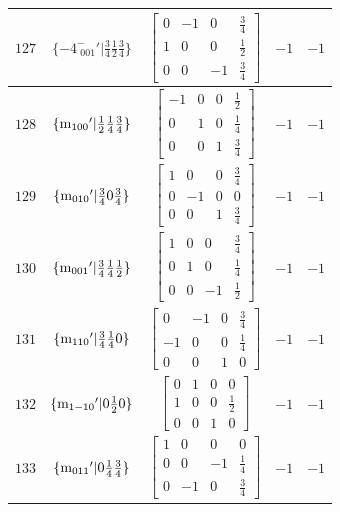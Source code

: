 \documentclass[fleqn,8pt]{jsarticle}
\begin{document}
\begin{longtable}{ccccc}
$ 127 $ & $ \{-4^{-}_{\,\,001}{}'|\frac{3}{4} \frac{1}{2} \frac{3}{4}\} $ & $ \begin{bmatrix} 0 & -1 & 0 & \frac{3}{4} \\ 1 & 0 & 0 & \frac{1}{2} \\ 0 & 0 & -1 & \frac{3}{4} \end{bmatrix} $ & $ -1 $ & $ -1 $ \\ \hline
$ 128 $ & $ \{{\rm m}_{100}{}'|\frac{1}{2} \frac{1}{4} \frac{3}{4}\} $ & $ \begin{bmatrix} -1 & 0 & 0 & \frac{1}{2} \\ 0 & 1 & 0 & \frac{1}{4} \\ 0 & 0 & 1 & \frac{3}{4} \end{bmatrix} $ & $ -1 $ & $ -1 $ \\ \hline
$ 129 $ & $ \{{\rm m}_{010}{}'|\frac{3}{4} 0 \frac{3}{4}\} $ & $ \begin{bmatrix} 1 & 0 & 0 & \frac{3}{4} \\ 0 & -1 & 0 & 0 \\ 0 & 0 & 1 & \frac{3}{4} \end{bmatrix} $ & $ -1 $ & $ -1 $ \\ \hline
$ 130 $ & $ \{{\rm m}_{001}{}'|\frac{3}{4} \frac{1}{4} \frac{1}{2}\} $ & $ \begin{bmatrix} 1 & 0 & 0 & \frac{3}{4} \\ 0 & 1 & 0 & \frac{1}{4} \\ 0 & 0 & -1 & \frac{1}{2} \end{bmatrix} $ & $ -1 $ & $ -1 $ \\ \hline
$ 131 $ & $ \{{\rm m}_{110}{}'|\frac{3}{4} \frac{1}{4} 0\} $ & $ \begin{bmatrix} 0 & -1 & 0 & \frac{3}{4} \\ -1 & 0 & 0 & \frac{1}{4} \\ 0 & 0 & 1 & 0 \end{bmatrix} $ & $ -1 $ & $ -1 $ \\ \hline
$ 132 $ & $ \{{\rm m}_{1-10}{}'|0 \frac{1}{2} 0\} $ & $ \begin{bmatrix} 0 & 1 & 0 & 0 \\ 1 & 0 & 0 & \frac{1}{2} \\ 0 & 0 & 1 & 0 \end{bmatrix} $ & $ -1 $ & $ -1 $ \\ \hline
$ 133 $ & $ \{{\rm m}_{011}{}'|0 \frac{1}{4} \frac{3}{4}\} $ & $ \begin{bmatrix} 1 & 0 & 0 & 0 \\ 0 & 0 & -1 & \frac{1}{4} \\ 0 & -1 & 0 & \frac{3}{4} \end{bmatrix} $ & $ -1 $ & $ -1 $ \\ \hline

\end{longtable}
\end{document}
